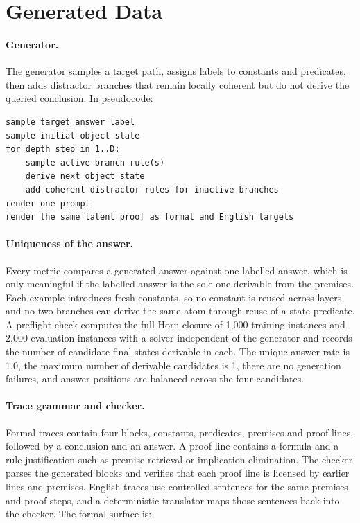 \section{Generated Data}
\label{sec:generator-eval}

\paragraph{Generator.} The generator samples a target path, assigns labels to
constants and predicates, then adds distractor branches that remain locally
coherent but do not derive the queried conclusion. In pseudocode:

\begin{verbatim}
sample target answer label
sample initial object state
for depth step in 1..D:
    sample active branch rule(s)
    derive next object state
    add coherent distractor rules for inactive branches
render one prompt
render the same latent proof as formal and English targets
\end{verbatim}

\paragraph{Uniqueness of the answer.}
Every metric compares a generated answer against one labelled answer, which
is only meaningful if the labelled answer is the sole one derivable from the
premises. Each example introduces fresh constants, so no constant is reused
across layers and no two branches can derive the same atom through reuse of
a state predicate. A preflight check computes the full Horn closure of
1{,}000 training instances and 2{,}000 evaluation instances with a solver
independent of the generator and records the number of candidate final
states derivable in each. The unique-answer rate is 1.0, the maximum number
of derivable candidates is 1, there are no generation failures, and answer
positions are balanced across the four candidates.

\paragraph{Trace grammar and checker.}
Formal traces contain four blocks, constants, predicates, premises and proof
lines, followed by a conclusion and an answer. A proof line contains a
formula and a rule justification such as premise retrieval or implication
elimination. The checker parses the generated blocks and verifies that each
proof line is licensed by earlier lines and premises. English traces use
controlled sentences for the same premises and proof steps, and a
deterministic translator maps those sentences back into the checker. The
formal surface is:

